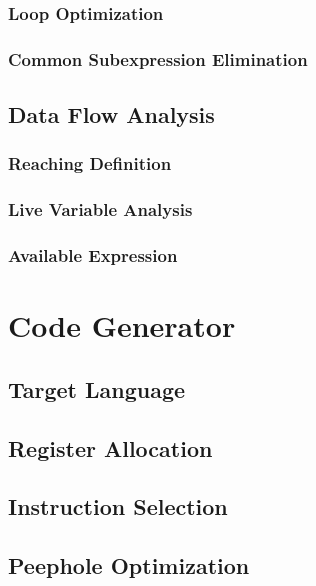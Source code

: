 \documentclass{book}
\begin{document}
              \subsubsection{Loop Optimization}
              \subsubsection{Common Subexpression Elimination}
         \subsection{Data Flow Analysis}
              \subsubsection{Reaching Definition}
              \subsubsection{Live Variable Analysis}
              \subsubsection{Available Expression}
    \section{Code Generator}
         \subsection{Target Language}
         \subsection{Register Allocation}
         \subsection{Instruction Selection}
         \subsection{Peephole Optimization}
\end{document}
